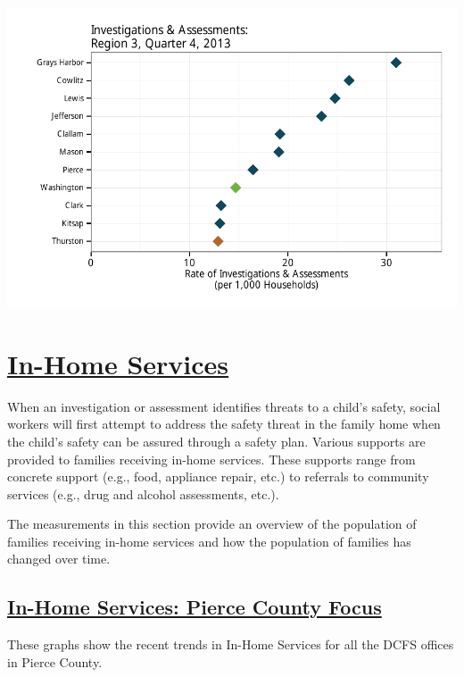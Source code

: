 \documentclass{article}\usepackage{graphicx, color}
\makeatletter
\def\maxwidth{ %
  \ifdim\Gin@nat@width>\linewidth
    \linewidth
  \else
    \Gin@nat@width
  \fi
}
\newenvironment{knitrout}{}{} %
\makeatother
\begin{document}
\begin{knitrout}
\color{fgcolor}

{\centering \includegraphics[width=\maxwidth]{figure/ia_context} 

}



\end{knitrout}



\section{\href{http://www.partnersforourchildren.org/child-well-being/visualizations/home-services/trends}
    {In-Home Services}
}
When an investigation or assessment identifies threats to a child's safety, social workers will first attempt to address the safety threat in the family home when the child's safety can be assured through a safety plan. Various supports are provided to families receiving in-home services. These supports range from concrete support (e.g., food, appliance repair, etc.) to referrals to community services (e.g., drug and alcohol assessments, etc.).

The measurements in this section provide an overview of the population of families receiving in-home services and how the
population of families has changed over time.

\subsection{\href{http://www.partnersforourchildren.org/child-well-being/visualizations/home-services/trends}
    {In-Home Services: Pierce County Focus}
}
These graphs show the recent trends in In-Home Services for all the DCFS offices in
Pierce County.
\end{document}
